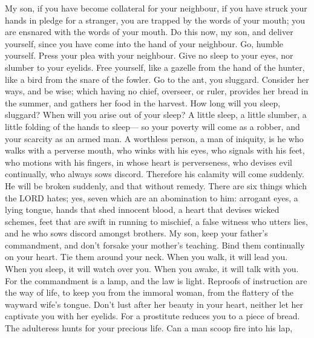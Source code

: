  My son, if you have become collateral for your neighbour,
if you have struck your hands in pledge for a stranger, 
you are trapped by the words of your mouth; you are ensnared with the
words of your mouth.  Do this now, my son, and deliver
yourself, since you have come into the hand of your neighbour. Go,
humble yourself. Press your plea with your neighbour. 
Give no sleep to your eyes, nor slumber to your eyelids. 
Free yourself, like a gazelle from the hand of the hunter, like a bird
from the snare of the fowler.  Go to the ant, you
sluggard. Consider her ways, and be wise;  which having no
chief, overseer, or ruler,  provides her bread in the
summer, and gathers her food in the harvest.  How long
will you sleep, sluggard? When will you arise out of your sleep?
 A little sleep, a little slumber, a little folding of
the hands to sleep---  so your poverty will come as a
robber, and your scarcity as an armed man.  A worthless
person, a man of iniquity, is he who walks with a perverse mouth,
 who winks with his eyes, who signals with his feet, who
motions with his fingers,  in whose heart is
perverseness, who devises evil continually, who always sows discord.
 Therefore his calamity will come suddenly. He will be
broken suddenly, and that without remedy.  There are six
things which the LORD hates; yes, seven which are an abomination to him:
 arrogant eyes, a lying tongue, hands that shed innocent
blood,  a heart that devises wicked schemes, feet that
are swift in running to mischief,  a false witness who
utters lies, and he who sows discord amongst brothers. 
My son, keep your father's commandment, and don't forsake your mother's
teaching.  Bind them continually on your heart. Tie them
around your neck.  When you walk, it will lead you. When
you sleep, it will watch over you. When you awake, it will talk with
you.  For the commandment is a lamp, and the law is
light. Reproofs of instruction are the way of life,  to
keep you from the immoral woman, from the flattery of the wayward wife's
tongue.  Don't lust after her beauty in your heart,
neither let her captivate you with her eyelids.  For a
prostitute reduces you to a piece of bread. The adulteress hunts for
your precious life.  Can a man scoop fire into his lap,
